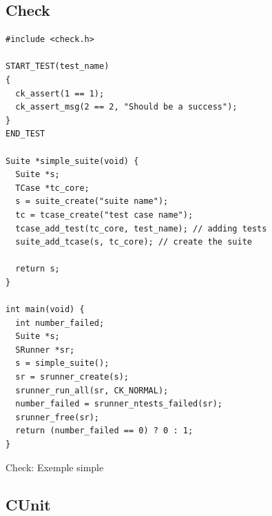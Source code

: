 \documentclass[a4paper]{article}
\begin{document}
\subsection*{Check}

\begin{listing}[ht!]
\begin{verbatim}
#include <check.h>

START_TEST(test_name)
{
  ck_assert(1 == 1);
  ck_assert_msg(2 == 2, "Should be a success");
}
END_TEST

Suite *simple_suite(void) {
  Suite *s;
  TCase *tc_core;
  s = suite_create("suite name");
  tc = tcase_create("test case name");
  tcase_add_test(tc_core, test_name); // adding tests
  suite_add_tcase(s, tc_core); // create the suite

  return s;
}

int main(void) {
  int number_failed;
  Suite *s;
  SRunner *sr;
  s = simple_suite();
  sr = srunner_create(s);
  srunner_run_all(sr, CK_NORMAL);
  number_failed = srunner_ntests_failed(sr);
  srunner_free(sr);
  return (number_failed == 0) ? 0 : 1;
}
\end{verbatim}
\caption{Check: Exemple simple}
\label{check-example}
\end{listing}

\clearpage{}
\subsection*{CUnit}
\end{document}
